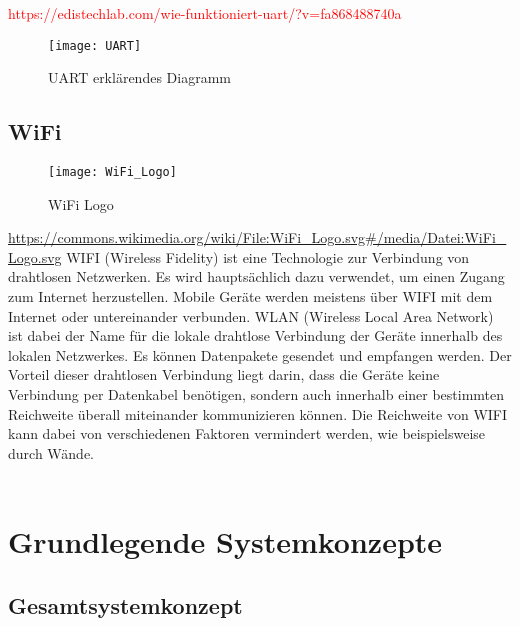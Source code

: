 \documentclass[titlepage,12pt,twoside]{article}
\begin{document}
\textcolor{red}{https://edistechlab.com/wie-funktioniert-uart/?v=fa868488740a}

\begin{figure}[H]
	\begin{center}
		\scalebox{1.0}
		{\texttt{[image: UART]}}
		\caption{UART erklärendes Diagramm}
		\label{fig:UART}		
	\end{center}
\end{figure}
\hfill \break

\subsection{WiFi}
\label{chap:WiFi}
\begin{figure}[H]
	\begin{center}
		\scalebox{1.2}
		{\texttt{[image: WiFi\_Logo]}}
		\caption{WiFi Logo}
		\label{fig:WiFi_Logo}
	\end{center}
\end{figure}
\hfill \break
\textcolor{red}{\url{https://commons.wikimedia.org/wiki/File:WiFi_Logo.svg\#/media/Datei:WiFi_Logo.svg}}
WIFI (Wireless Fidelity) ist eine Technologie zur Verbindung von drahtlosen Netzwerken. Es wird 
hauptsächlich dazu verwendet, um einen Zugang zum Internet herzustellen. Mobile Geräte werden meistens 
über WIFI mit dem Internet oder untereinander verbunden. WLAN (Wireless Local Area Network) ist dabei 
der Name für die lokale drahtlose Verbindung der Geräte innerhalb des lokalen Netzwerkes. Es können 
Datenpakete gesendet und empfangen werden. Der Vorteil dieser drahtlosen Verbindung liegt darin, dass 
die Geräte keine Verbindung per Datenkabel benötigen, sondern auch innerhalb einer bestimmten Reichweite 
überall miteinander kommunizieren können. Die Reichweite von WIFI kann dabei von verschiedenen Faktoren 
vermindert werden, wie beispielsweise durch Wände. \\
\\

\newpage

\section{Grundlegende Systemkonzepte}
\label{chap:Grundlegende Systemkonzepte}

\subsection{Gesamtsystemkonzept}
\label{chap:Gesamtsystemkonzept}
\end{document}
